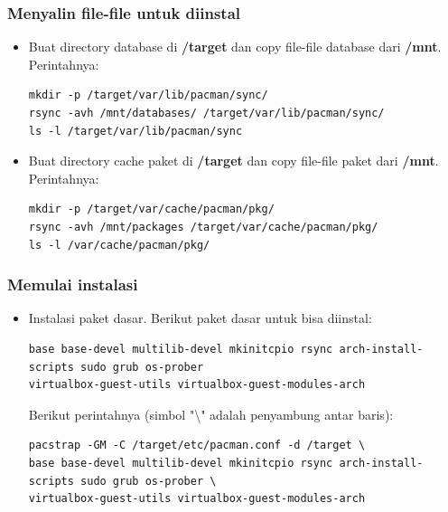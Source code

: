 \documentclass[12pt,]{article}
\begin{document}
	\subsubsection{Menyalin file-file untuk diinstal}
	\begin{itemize}
	\item Buat directory database di \textbf{/target} dan copy file-file database dari \textbf{/mnt}.
		Perintahnya:
		\begin{verbatim}
mkdir -p /target/var/lib/pacman/sync/
rsync -avh /mnt/databases/ /target/var/lib/pacman/sync/
ls -l /target/var/lib/pacman/sync
		\end{verbatim}
		
		\item Buat directory cache paket di \textbf{/target} dan copy file-file paket dari \textbf{/mnt}.
		Perintahnya:
		\begin{verbatim}
mkdir -p /target/var/cache/pacman/pkg/
rsync -avh /mnt/packages /target/var/cache/pacman/pkg/
ls -l /var/cache/pacman/pkg/
		\end{verbatim}
	\end{itemize}

	\subsubsection{Memulai instalasi}
	\begin{itemize}
		\item Instalasi paket dasar.
		Berikut paket dasar untuk bisa diinstal:
		\begin{verbatim}
base base-devel multilib-devel mkinitcpio rsync arch-install-scripts sudo grub os-prober
virtualbox-guest-utils virtualbox-guest-modules-arch
		\end{verbatim}
		Berikut perintahnya (simbol "\textbackslash" adalah penyambung antar baris):
		\begin{verbatim}
pacstrap -GM -C /target/etc/pacman.conf -d /target \
base base-devel multilib-devel mkinitcpio rsync arch-install-scripts sudo grub os-prober \
virtualbox-guest-utils virtualbox-guest-modules-arch
		\end{verbatim}
	\end{itemize}
\end{document}

